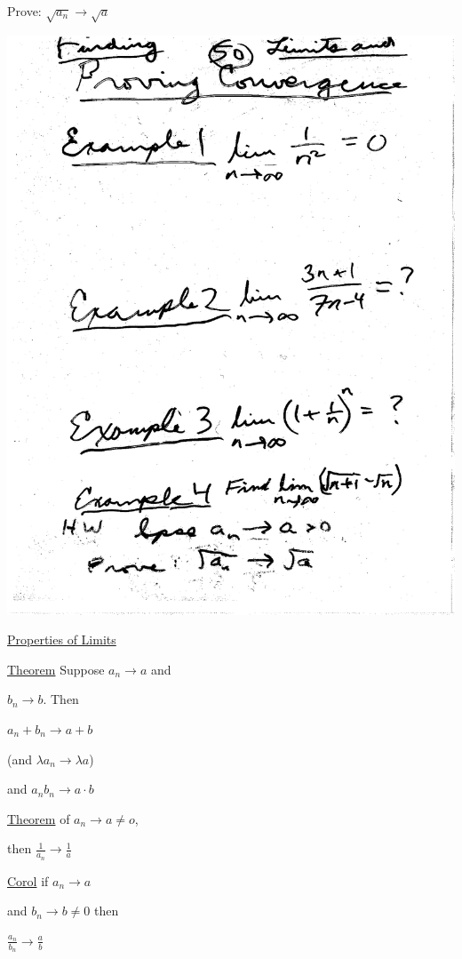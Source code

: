\documentclass[10pt,a4paper]{article}
\begin{document}
{{Prove: $\sqrt{a_n} \rightarrow \sqrt{a}$

\includegraphics[scale=.5]{Pages/LC_50}

\newpage
\underline{Properties of Limits}

\underline{Theorem} Suppose $a_n \rightarrow a$ and
 
$b_n \rightarrow b$. Then

$a_n + b_n \rightarrow a + b$

(and $\lambda a_n \rightarrow \lambda a$)

and $a_n b_n \rightarrow a \cdot b$

\underline{Theorem} of $a_n \rightarrow a \neq o$,

then $\frac{1}{a_n} \rightarrow \frac{1}{a}$

\underline{Corol} if $a_n \rightarrow a$ 

and $b_n \rightarrow b \neq 0$ then 

$\frac{a_n}{b_n} \rightarrow \frac{a}{b}$

}}
\end{document}
